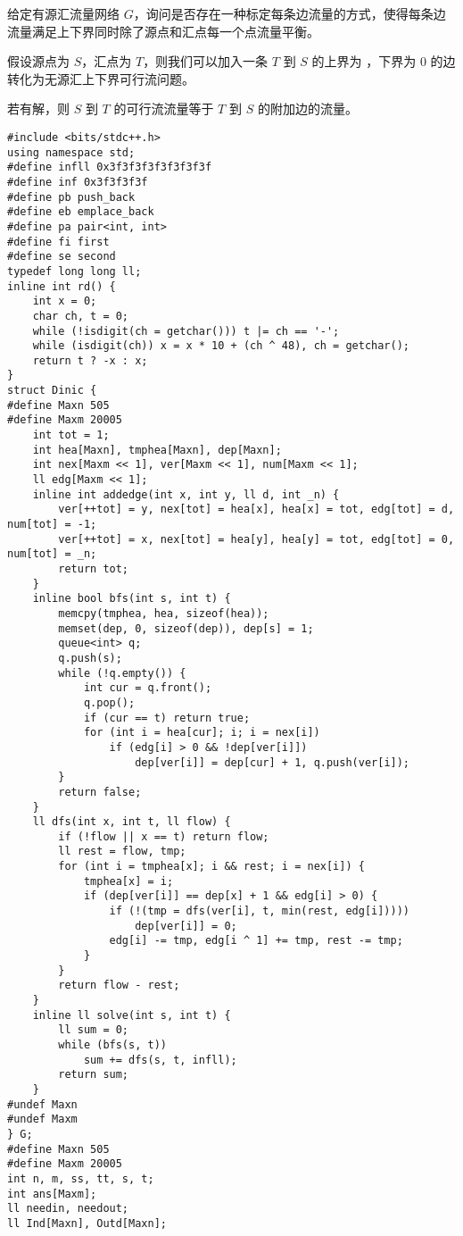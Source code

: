 给定有源汇流量网络 $G$，询问是否存在一种标定每条边流量的方式，使得每条边流量满足上下界同时除了源点和汇点每一个点流量平衡。

假设源点为 $S$，汇点为 $T$，则我们可以加入一条 $T$ 到 $S$ 的上界为 \infty，下界为 $0$ 的边转化为无源汇上下界可行流问题。

若有解，则 $S$ 到 $T$ 的可行流流量等于 $T$ 到 $S$ 的附加边的流量。

\begin{verbatim}
#include <bits/stdc++.h>
using namespace std;
#define infll 0x3f3f3f3f3f3f3f3f
#define inf 0x3f3f3f3f
#define pb push_back
#define eb emplace_back
#define pa pair<int, int>
#define fi first
#define se second
typedef long long ll;
inline int rd() {
    int x = 0;
    char ch, t = 0;
    while (!isdigit(ch = getchar())) t |= ch == '-';
    while (isdigit(ch)) x = x * 10 + (ch ^ 48), ch = getchar();
    return t ? -x : x;
}
struct Dinic {
#define Maxn 505
#define Maxm 20005
    int tot = 1;
    int hea[Maxn], tmphea[Maxn], dep[Maxn];
    int nex[Maxm << 1], ver[Maxm << 1], num[Maxm << 1];
    ll edg[Maxm << 1];
    inline int addedge(int x, int y, ll d, int _n) {
        ver[++tot] = y, nex[tot] = hea[x], hea[x] = tot, edg[tot] = d, num[tot] = -1;
        ver[++tot] = x, nex[tot] = hea[y], hea[y] = tot, edg[tot] = 0, num[tot] = _n;
        return tot;
    }
    inline bool bfs(int s, int t) {
        memcpy(tmphea, hea, sizeof(hea));
        memset(dep, 0, sizeof(dep)), dep[s] = 1;
        queue<int> q;
        q.push(s);
        while (!q.empty()) {
            int cur = q.front();
            q.pop();
            if (cur == t) return true;
            for (int i = hea[cur]; i; i = nex[i])
                if (edg[i] > 0 && !dep[ver[i]])
                    dep[ver[i]] = dep[cur] + 1, q.push(ver[i]);
        }
        return false;
    }
    ll dfs(int x, int t, ll flow) {
        if (!flow || x == t) return flow;
        ll rest = flow, tmp;
        for (int i = tmphea[x]; i && rest; i = nex[i]) {
            tmphea[x] = i;
            if (dep[ver[i]] == dep[x] + 1 && edg[i] > 0) {
                if (!(tmp = dfs(ver[i], t, min(rest, edg[i]))))
                    dep[ver[i]] = 0;
                edg[i] -= tmp, edg[i ^ 1] += tmp, rest -= tmp;
            }
        }
        return flow - rest;
    }
    inline ll solve(int s, int t) {
        ll sum = 0;
        while (bfs(s, t))
            sum += dfs(s, t, infll);
        return sum;
    }
#undef Maxn
#undef Maxm
} G;
#define Maxn 505
#define Maxm 20005
int n, m, ss, tt, s, t;
int ans[Maxm];
ll needin, needout;
ll Ind[Maxn], Outd[Maxn];

\end{verbatim}
